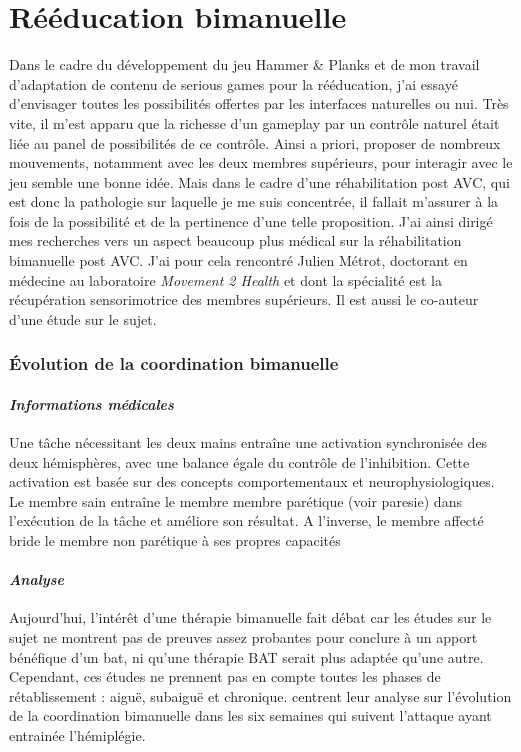 	
\section{Rééducation bimanuelle} \label{bilateral}
	Dans le cadre du développement du jeu Hammer \& Planks et de mon travail d'adaptation de contenu de serious games pour la rééducation, j'ai essayé d'envisager toutes les possibilités offertes par les interfaces naturelles ou \gls{nui}. Très vite, il m'est apparu que la richesse d'un gameplay par un contrôle naturel était liée au panel de possibilités de ce contrôle. Ainsi a priori, proposer de nombreux mouvements, notamment avec les deux membres supérieurs, pour interagir avec le jeu semble une bonne idée. Mais dans le cadre d'une réhabilitation post AVC, qui est donc la pathologie sur laquelle je me suis concentrée, il fallait m'assurer à la fois de la possibilité et de la pertinence d'une telle proposition. J'ai ainsi dirigé mes recherches vers un aspect beaucoup plus médical sur la réhabilitation bimanuelle post AVC. J'ai pour cela rencontré Julien Métrot, doctorant en médecine au laboratoire \emph{Movement 2 Health} et dont la spécialité est la récupération sensorimotrice des membres supérieurs. Il est aussi le co-auteur d'une étude sur le sujet.
	
		\subsubsection*{Évolution de la coordination bimanuelle} 
		
		\paragraph{\emph{Informations médicales}\\}
Une tâche nécessitant les deux mains entraîne une activation synchronisée des deux hémisphères, avec une balance égale du contrôle de l'inhibition. Cette activation est basée sur des concepts comportementaux et neurophysiologiques.\\
Le membre sain entraîne le membre membre parétique (voir \gls{paresie}) dans l'exécution de la tâche et améliore son résultat. A l'inverse, le membre affecté bride le membre non parétique à ses propres capacités		
		\paragraph{\emph{Analyse}\\}
Aujourd'hui, l'intérêt d'une thérapie bimanuelle fait débat car les études sur le sujet ne montrent pas de preuves assez probantes pour conclure à un apport bénéfique d'un \gls{bat}, ni qu'une thérapie BAT serait plus adaptée qu'une autre. Cependant, ces études ne prennent pas en compte toutes les phases de rétablissement : aiguë, subaiguë et chronique.\newline
[Metrot et al, 2013]\cite{Metr13} centrent leur analyse sur l'évolution de la coordination bimanuelle dans les six semaines qui suivent l'attaque ayant entrainée l'hémiplégie.

